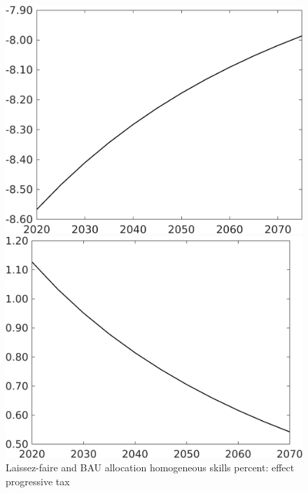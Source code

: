 \begin{figure}[h!!]
	\centering
	\caption{Laissez-faire and BAU allocation homogeneous skills percent: effect progressive tax }\label{fig:LF_BAU_nsk1_per}
	\begin{minipage}[]{0.32\textwidth}
		\includegraphics[width=1\textwidth]{../../codding_model/own_basedOnFried/optimalPol_010922_revision/figures/all_13Sept22/CompTaul_LFBAUPer_Reg0_Emnet_spillover0_nsk1_xgr0_sep1_countec0_GovRev1_etaa0.79.png}
	\end{minipage}	
	\begin{minipage}[]{0.32\textwidth}
		\includegraphics[width=1\textwidth]{../../codding_model/own_basedOnFried/optimalPol_010922_revision/figures/all_13Sept22/CompTaul_LFBAUPer_Reg0_gAagg_spillover0_nsk1_xgr0_sep1_countec0_GovRev1_etaa0.79.png}

\end{minipage}
\end{figure}
